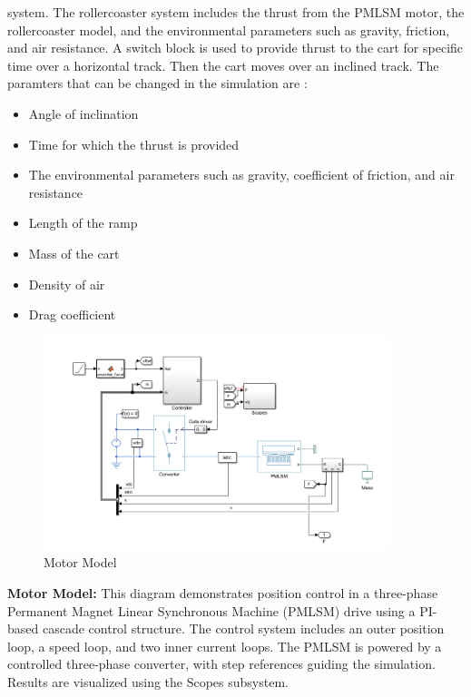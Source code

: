 \documentclass{article}
\begin{document}
    system. The rollercoaster system includes the thrust from the PMLSM motor,
    the rollercoaster model, and the environmental parameters such as gravity,
    friction, and air resistance. A switch block is used to provide thrust to
    the cart for specific time over a horizontal track. Then the cart moves over
    an inclined track. The paramters that can be changed in the simulation are :
    \begin{itemize}
        \item Angle of inclination

        \item Time for which the thrust is provided

        \item The environmental parameters such as gravity, coefficient of
            friction, and air resistance

        \item Length of the ramp

        \item Mass of the cart

        \item Density of air

        \item Drag coefficient
    \end{itemize}
    \begin{figure}[H]
        \centering
        \includegraphics[width=0.9\textwidth]{
            ./Snapshots/Screenshot 2024-12-08 042938.png
        } %
        \caption{Motor Model}
        \label{fig:Motor Model}
    \end{figure}
    \textbf{Motor Model:} This diagram demonstrates position control in a three-phase
    Permanent Magnet Linear Synchronous Machine (PMLSM) drive using a PI-based cascade
    control structure. The control system includes an outer position loop, a speed
    loop, and two inner current loops. The PMLSM is powered by a controlled three-phase
    converter, with step references guiding the simulation. Results are visualized
    using the Scopes subsystem.
\end{document}
